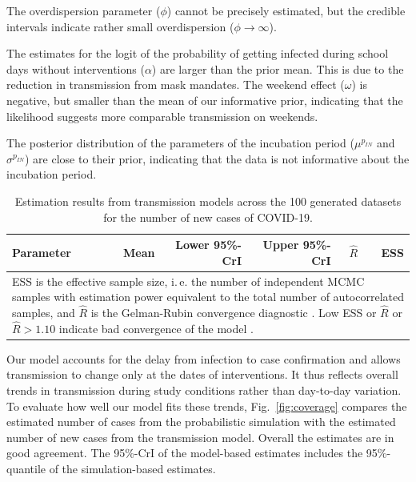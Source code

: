 \documentclass[fleqn,11pt]{wlscirep_supp}
\newcommand\ie{i.\,e.\xspace}
\begin{document}
The overdispersion parameter ($\phi$) cannot be precisely estimated, but the credible intervals indicate rather small overdispersion ($\phi \rightarrow \infty$).

The estimates for the logit of the probability of getting infected during school days without interventions ($\alpha$) are larger than the prior mean. This is due to the reduction in transmission from mask mandates. The weekend effect ($\omega$) is negative, but smaller than the mean of our informative prior, indicating that the likelihood suggests more comparable transmission on weekends.   

The posterior distribution of the parameters of the incubation period ($\mu^{p_{IN}}$ and $\sigma^{p_{IN}}$) are close to their prior, indicating that the data is not informative about the incubation period.  

\begin{table}[!htpb]
    \caption[Estimation results from transmission model]{Estimation results from transmission models across the 100 generated datasets for the number of new cases of COVID-19.}
    \label{tab:estimation-results}
    \footnotesize
    \centering
    \begin{tabular}{lrrrrr}
    \toprule
    Parameter & Mean & Lower 95\%-CrI & Upper 95\%-CrI & $\hat{R}$ & ESS \\
    \midrule
    
    \bottomrule
    \multicolumn{6}{p{13cm}}{\scriptsize
        ESS is the effective sample size, \ie the number of independent MCMC samples with estimation power equivalent to the total number of autocorrelated samples\cite{Stan2022}, and $\hat{R}$ is the Gelman-Rubin convergence diagnostic \cite{Gelman1992}. Low ESS or $\hat{R}$ or $\hat{R}>1.10$ indicate bad convergence of the model \cite{Gelman2013}.}
    \end{tabular}
\end{table}

Our model accounts for the delay from infection to case confirmation and allows transmission to change only at the dates of interventions. It thus reflects overall trends in transmission during study conditions rather than day-to-day variation. To evaluate how well our model fits these trends, Fig.~\ref{fig:coverage} compares the estimated number of cases from the probabilistic simulation with the estimated number of new cases from the transmission model. Overall the estimates are in good agreement. The 95\%-CrI of the model-based estimates includes the 95\%-quantile of the simulation-based estimates. 
\end{document}
